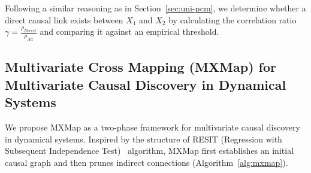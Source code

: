 Following a similar reasoning as in Section~\ref{sec:uni-pcm}, we determine whether a direct causal link exists between $X_1$ and $X_2$ by calculating the correlation ratio $\gamma = \frac{\rho_{Direct}}{\rho_{All}}$ and comparing it against an empirical threshold.


\subsection{Multivariate Cross Mapping (MXMap) for Multivariate Causal Discovery in Dynamical Systems}
\label{sec:mxmap}

We propose MXMap as a two-phase framework for multivariate causal discovery in dynamical systems. Inspired by the structure of RESIT (Regression with Subsequent Independence Test)~\citep{peters2014causal} algorithm, MXMap first establishes an initial causal graph and then prunes indirect connections (Algorithm~\ref{alg:mxmap}). 


